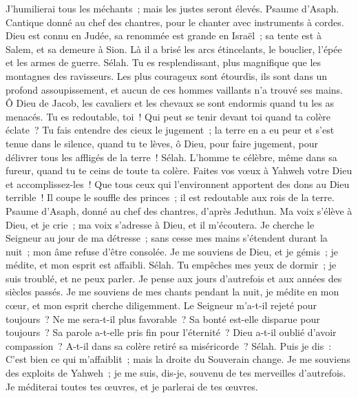 \begin{multicols}{2}
J'humilierai tous les méchants~; mais les justes seront élevés.
\VerseOne{}Psaume d'Asaph. Cantique donné au chef des chantres, pour le chanter avec instruments à cordes.
Dieu est connu en Judée, sa renommée est grande en Israël~;
sa tente est à Salem, et sa demeure à Sion.
Là il a brisé les arcs étincelants, le bouclier, l'épée et les armes de guerre. Sélah.
Tu es resplendissant, plus magnifique que les montagnes des ravisseurs.
Les plus courageux sont étourdis, ils sont dans un profond assoupissement, et aucun de ces hommes vaillants n'a trouvé ses mains.
Ô Dieu de Jacob, les cavaliers et les chevaux se sont endormis quand tu les as menacés.
Tu es redoutable, toi~! Qui peut se tenir devant toi quand ta colère éclate~?
Tu fais entendre des cieux le jugement~; la terre en a eu peur et s'est tenue dans le silence,
quand tu te lèves, ô Dieu, pour faire jugement, pour délivrer tous les affligés de la terre~! Sélah.
L'homme te célèbre, même dans sa fureur, quand tu te ceins de toute ta colère.
Faites vos vœux à Yahweh votre Dieu et accomplissez-les~! Que tous ceux qui l'environnent apportent des dons au Dieu terrible~!
Il coupe le souffle des princes~; il est redoutable aux rois de la terre.
\VerseOne{}Psaume d'Asaph, donné au chef des chantres, d'après Jeduthun.
Ma voix s'élève à Dieu, et je crie~; ma voix s'adresse à Dieu, et il m'écoutera.
Je cherche le Seigneur au jour de ma détresse~; sans cesse mes mains s'étendent durant la nuit~; mon âme refuse d'être consolée.
Je me souviens de Dieu, et je gémis~; je médite, et mon esprit est affaibli. Sélah.
Tu empêches mes yeux de dormir~; je suis troublé, et ne peux parler.
Je pense aux jours d'autrefois et aux années des siècles passés.
Je me souviens de mes chants pendant la nuit, je médite en mon cœur, et mon esprit cherche diligemment.
Le Seigneur m'a-t-il rejeté pour toujours~? Ne me sera-t-il plus favorable~?
Sa bonté est-elle disparue pour toujours~? Sa parole a-t-elle pris fin pour l'éternité~?
Dieu a-t-il oublié d'avoir compassion~? A-t-il dans sa colère retiré sa miséricorde~? Sélah.
Puis je dis~: C'est bien ce qui m'affaiblit~; mais la droite du Souverain change.
Je me souviens des exploits de Yahweh~; je me suis, dis-je, souvenu de tes merveilles d'autrefois.
Je méditerai toutes tes œuvres, et je parlerai de tes œuvres.

\end{multicols}
